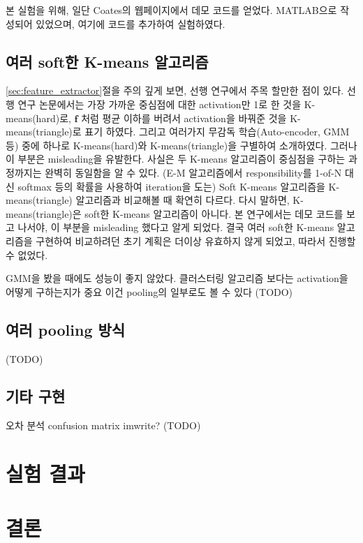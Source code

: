 \documentclass[a4paper,9pt]{article}
\begin{document}
\begin{multicols}{2}
본 실험을 위해, 일단 Coates의 웹페이지에서 데모 코드를 얻었다.
MATLAB으로 작성되어 있었으며, 여기에 코드를 추가하여 실험하였다.

\subsection{여러 soft한 K-means 알고리즘}

\ref{sec:feature_extractor}절을 주의 깊게 보면, 선행 연구에서 주목 할만한 점이 있다.
선행 연구 논문에서는 가장 가까운 중심점에 대한 activation만 1로 한 것을 K-means(hard)로, $\mathbf{f}$ 처럼 평균 이하를 버려서 activation을 바꿔준 것을 K-means(triangle)로 표기 하였다.
그리고 여러가지 무감독 학습(Auto-encoder, GMM 등) 중에 하나로 K-means(hard)와 K-means(triangle)을 구별하여 소개하였다.
그러나 이 부분은 misleading을 유발한다.
사실은 두 K-means 알고리즘이 중심점을 구하는 과정까지는 완벽히 동일함을 알 수 있다.
(E-M 알고리즘에서 responsibility를 1-of-N 대신 softmax 등의 확률을 사용하여 iteration을 도는) Soft K-means 알고리즘을 K-means(triangle) 알고리즘과 비교해볼 때 확연히 다르다.
다시 말하면, K-means(triangle)은 soft한 K-means 알고리즘이 아니다.
본 연구에서는 데모 코드를 보고 나서야, 이 부분을 misleading 했다고 알게 되었다.
결국 여러 soft한 K-means 알고리즘을 구현하여 비교하려던 초기 계획은 더이상 유효하지 않게 되었고, 따라서 진행할 수 없었다.

GMM을 봤을 때에도 성능이 좋지 않았다.
클러스터링 알고리즘 보다는 activation을 어떻게 구하는지가 중요
이건 pooling의 일부로도 볼 수 있다
(TODO)

\subsection{여러 pooling 방식}

(TODO)

\subsection{기타 구현}

오차 분석
confusion matrix
imwrite?
(TODO)

\section{실험 결과}

\section{결론}


\end{multicols}
\end{document}
